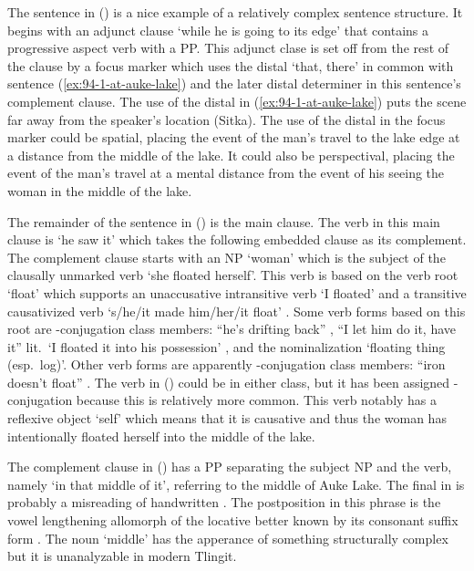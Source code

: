 The sentence in (\lastx) is a nice example of a relatively complex sentence structure.
It begins with an adjunct clause  ‘while he is going to its edge’ that contains a progressive aspect verb with a PP.
This adjunct clase is set off from the rest of the clause by a focus marker  which uses the distal  ‘that, there’ in common with sentence (\ref{ex:94-1-at-auke-lake}) and the later distal determiner in this sentence’s complement clause.
The use of the distal in (\ref{ex:94-1-at-auke-lake}) puts the scene far away from the speaker’s location (Sitka).
The use of the distal in the focus marker could be spatial, placing the event of the man’s travel to the lake edge at a distance from the middle of the lake.
It could also be perspectival, placing the event of the man’s travel at a mental distance from the event of his seeing the woman in the middle of the lake.

The remainder of the sentence in (\lastx) is the main clause.
The verb in this main clause is  ‘he saw it’ which takes the following embedded clause as its complement.
The complement clause starts with an NP  ‘woman’ which is the subject of the clausally unmarked verb  ‘she floated herself’.
This verb is based on the verb root  ‘float’ which supports an unaccusative intransitive verb  ‘I floated’ and a transitive causativized verb  ‘s/he/it made him/her/it float’ \parencite[45]{leer:1976}.
Some verb forms based on this root are -conjugation class members:  “he’s drifting back” \parencite[93.1184]{story-naish:1973},  “I let him do it, have it” lit.\ ‘I floated it into his possession’ \parencite[01/94]{leer:1973}, and the nominalization  ‘floating thing (esp.\ log)’.
Other verb forms are apparently -conjugation class members:  “iron doesn’t float” \parencite[93.1183]{story-naish:1973}.
The verb  in (\lastx) could be in either class, but it has been assigned -conjugation because this is relatively more common.
This verb notably has a reflexive object  ‘self’ which means that it is causative and thus the woman has intentionally floated herself into the middle of the lake.

The complement clause in (\lastx) has a PP separating the subject NP and the verb, namely  ‘in that middle of it’, referring to the middle of  Auke Lake.
The final  in  is probably a misreading of handwritten .
The postposition in this phrase is the vowel lengthening allomorph  of the locative better known by its consonant suffix form .
The noun  ‘middle’ has the apperance of something structurally complex but it is unanalyzable in modern Tlingit.

